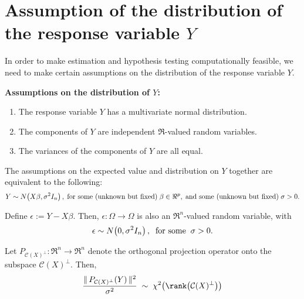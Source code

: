 \documentclass{article}
\begin{document}

\section{Assumption of the distribution of the response variable $Y$}
\setcounter{theorem}{0}\setcounter{equation}{0}

In order to make estimation and hypothesis testing computationally feasible, we need to make certain assumptions on the distribution of the response variable $Y$.

\begin{center}
\begin{minipage}{16cm}
\vskip 0.3cm
\noindent
\textbf{Assumptions on the distribution of $Y$:}
\begin{enumerate}
\item	The response variable $Y$ has a multivariate normal distribution.
\item	The components of $Y$ are independent $\Re$-valued random variables.
\item	The variances of the components of $Y$ are all equal.
\end{enumerate}
\end{minipage}
\end{center}

\vskip 0.3cm
\noindent
The assumptions on the expected value and distribution on $Y$ together are equivalent to the following:
\begin{equation}\label{ErrorNormalityIndependenceEqualVariance}
Y \sim N\!\left(X\beta,\sigma^{2}I_{n}\right),\;\textnormal{for some (unknown but fixed)}\;\beta\in\Re^{p},\;\textnormal{and some (unknown but fixed)}\;\sigma > 0.
\end{equation}

Define $\epsilon := Y - X\beta$.  Then, $\epsilon : \Omega \longrightarrow \Omega$ is also an $\Re^{n}$-valued random variable, with
\begin{equation}
\epsilon \sim N\!\left(0,\sigma^{2}I_{n}\right),\;\;\textnormal{for some}\;\;\sigma > 0.
\end{equation}

\begin{proposition} \mbox{}
\vskip 0.1cm
\noindent
Let $P_{\mathcal{C}(X)^{\perp}} : \Re^{n} \longrightarrow \Re^{n}$ denote the orthogonal projection operator onto the subspace $\mathcal{C}(X)^{\perp}$.  Then,
\begin{equation*}
\dfrac{\Vert\,P_{\mathcal{C}(X)^{\perp}}(Y)\,\Vert^{2}}{\sigma^{2}} \; \sim \; \chi^{2}\!\left(\rank\!\left(\mathcal{C}(X)^{\perp}\right)\right)
\end{equation*}
\end{proposition}
\end{document}
